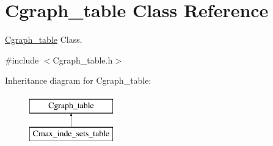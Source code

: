 \hypertarget{class_cgraph__table}{}\section{Cgraph\+\_\+table Class Reference}
\label{class_cgraph__table}


\hyperlink{class_cgraph__table}{Cgraph\+\_\+table} Class.  




{\ttfamily \#include $<$Cgraph\+\_\+table.\+h$>$}

Inheritance diagram for Cgraph\+\_\+table\+:\begin{figure}[H]
\begin{center}
\leavevmode
\includegraphics[height=2.000000cm]{class_cgraph__table}
\end{center}
\end{figure}
